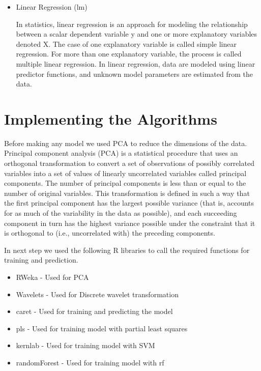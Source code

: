 \documentclass[12pt,letterpaper]{article}
\begin{document}
\begin{itemize}
	\item Linear Regression (lm)
	
	In statistics, linear regression is an approach for modeling the relationship between a scalar dependent variable y and one or more explanatory variables denoted X. The case of one explanatory variable is called simple linear regression. For more than one explanatory variable, the process is called multiple linear regression. In linear regression, data are modeled using linear predictor functions, and unknown model parameters are estimated from the data. 
	
\end{itemize}

\section{Implementing the Algorithms}

Before making any model we used PCA to reduce the dimensions of the data. Principal component analysis (PCA) is a statistical procedure that uses an orthogonal transformation to convert a set of observations of possibly correlated variables into a set of values of linearly uncorrelated variables called principal components. The number of principal components is less than or equal to the number of original variables. This transformation is defined in such a way that the first principal component has the largest possible variance (that is, accounts for as much of the variability in the data as possible), and each succeeding component in turn has the highest variance possible under the constraint that it is orthogonal to (i.e., uncorrelated with) the preceding components.

In next step we used the following R libraries to call the required functions for training and prediction. 

\begin{itemize}
	\item RWeka - Used for PCA
	\item Wavelets - Used for Discrete wavelet transformation
	\item caret - Used for training and predicting the model
	\item pls - Used for training model with partial least squares
	\item kernlab - Used for training model with SVM
	\item randomForest - Used for training model with rf
\end{itemize}
\end{document}
